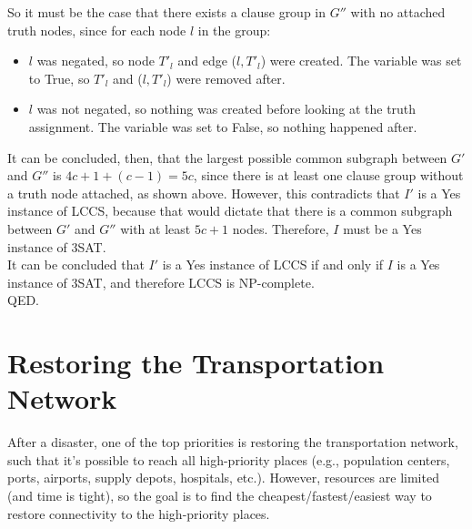 \documentclass[11pt]{article}
\begin{document}
\begin{enumerate}
\begin{soln}
So it must be the case that there exists a clause group in $G''$ with no attached truth nodes, since for each node $l$ in the group: 
\begin{itemize}
    \item $l$ was negated, so node $T'_l$ and edge ($l, T'_l$) were created. The variable was set to True, so $T'_l$ and ($l, T'_l$) were removed after.
    \item $l$ was not negated, so nothing was created before looking at the truth assignment. The variable was set to False, so nothing happened after.
\end{itemize}

It can be concluded, then, that the largest possible common subgraph between $G'$ and $G''$ is $4c+1+(c-1)=5c$, since there is at least one clause group without a truth node attached, as shown above. However, this contradicts that $I'$ is a Yes instance of LCCS, because that would dictate that there is a common subgraph between $G'$ and $G''$ with at least $5c+1$ nodes. Therefore, $I$ must be a Yes instance of 3SAT. \\

It can be concluded that $I'$ is a Yes instance of LCCS if and only if $I$ is a Yes instance of 3SAT, and therefore LCCS is NP-complete. \\ 

QED.


\end{soln}

\end{enumerate}

\clearpage


\section{Restoring the Transportation Network}

After a disaster, one of the top priorities is restoring the transportation
network, such that it's possible to reach all high-priority places
(e.g., population centers, ports, airports, supply depots, hospitals, etc.).
However, resources are limited (and time is tight), so the goal
is to find the cheapest/fastest/easiest way to restore connectivity to
the high-priority places.
\end{document}
